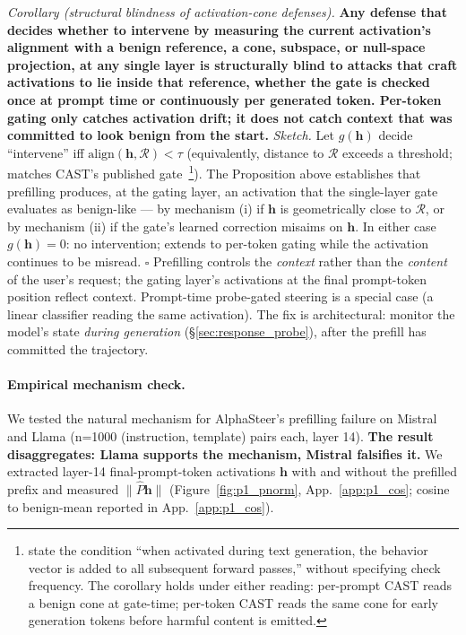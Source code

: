 \documentclass{article}
\begin{document}
\emph{Corollary (structural blindness of activation-cone defenses).} \textbf{Any defense that decides whether to intervene by measuring the current activation's alignment with a benign reference, a cone, subspace, or null-space projection, at any single layer is structurally blind to attacks that craft activations to lie inside that reference, whether the gate is checked once at prompt time or continuously per generated token. Per-token gating only catches activation drift; it does not catch context that was committed to look benign from the start.} \emph{Sketch.} Let $g(\mathbf{h})$ decide ``intervene'' iff $\mathrm{align}(\mathbf{h}, \mathcal{R}) < \tau$ (equivalently, distance to $\mathcal{R}$ exceeds a threshold; matches CAST's published gate~\citep{cast2025}\footnote{\citet{cast2025} state the condition ``when activated during text generation, the behavior vector is added to all subsequent forward passes,'' without specifying check frequency. The corollary holds under either reading: per-prompt CAST reads a benign cone at gate-time; per-token CAST reads the same cone for early generation tokens before harmful content is emitted.}). The Proposition above establishes that prefilling produces, at the gating layer, an activation that the single-layer gate evaluates as benign-like --- by mechanism (i) if $\mathbf{h}$ is geometrically close to $\mathcal{R}$, or by mechanism (ii) if the gate's learned correction misaims on $\mathbf{h}$. In either case $g(\mathbf{h})=0$: no intervention; extends to per-token gating while the activation continues to be misread. $\square$ Prefilling controls the \emph{context} rather than the \emph{content} of the user's request; the gating layer's activations at the final prompt-token position reflect context. Prompt-time probe-gated steering is a special case (a linear classifier reading the same activation). The fix is architectural: monitor the model's state \emph{during generation} (\S\ref{sec:response_probe}), after the prefill has committed the trajectory.

\paragraph{Empirical mechanism check.}
\label{sec:mechanism_check}
We tested the natural mechanism for AlphaSteer's prefilling failure on Mistral and Llama (n=1000 (instruction, template) pairs each, layer 14). \textbf{The result disaggregates: Llama supports the mechanism, Mistral falsifies it.} We extracted layer-14 final-prompt-token activations $\mathbf{h}$ with and without the prefilled prefix and measured $\|\hat{P}\mathbf{h}\|$ (Figure~\ref{fig:p1_pnorm}, App.~\ref{app:p1_cos}; cosine to benign-mean reported in App.~\ref{app:p1_cos}).
\end{document}

